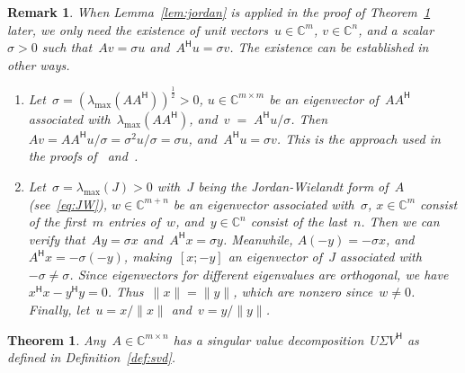 \documentclass[11pt,a4paper]{article}
\newtheorem{theorem}{Theorem}%
\newtheorem{remark}{Remark}%
\theoremstyle{definition}
\def\CC{\mathbb{C}}
\newcommand{\hmt}{{\scriptscriptstyle{{\mathsf{H}}}}}
\begin{document}
\begin{remark}
  When Lemma~\ref{lem:jordan} is applied in the proof of Theorem~\ref{th:svd} later, we only need
  the existence of unit vectors~$u\in\CC^{m}$, $v\in\CC^{n}$, and a scalar~$\sigma>0$
  such that~$Av = \sigma u$ and~$A^\hmt u = \sigma v$. The existence can be established in other
  ways. 
  \begin{enumerate}[leftmargin=1.5em]
    \item Let~$\sigma = (\lambda_{\max}(AA^\hmt))^{\frac{1}{2}}>0$, $u\in\CC^{m\times m}$ be an eigenvector
      of~$AA^\hmt$ associated with~$\lambda_{\max}(AA^\hmt)$, and~$v\;=\;A^\hmt u/\sigma$.
      Then~$Av = AA^\hmt u/\sigma = \sigma^2 u/\sigma=\sigma u$, and~$A^\hmt u = \sigma v$.   
      This is the approach used 
      in the proofs of~\cite[Theorem~4.1]{Trefethen_Bau_1997} and~\cite[Theorem~1]{Koranyi_2001}.
    \item Let~$\sigma = \lambda_{\max}(J) >0$ with~$J$ being the Jordan-Wielandt form of~$A$
      \textnormal{(}see~\eqref{eq:JW}\textnormal{)}, $w\in\CC^{m+n}$ be an eigenvector associated with~$\sigma$, 
      $x\in\CC^{m}$ consist of the first~$m$ entries of~$w$, and~$y\in\CC^{n}$ consist of the
      last~$n$. Then we can verify that~$Ay=\sigma x$ and~$A^\hmt x=\sigma y$.
      Meanwhile, $A(-y) = -\sigma x$, and~$A^\hmt x = -\sigma (-y)$, making~$[x; -y]$ 
      an eigenvector of~$J$ associated with~$-\sigma \neq \sigma$. Since eigenvectors for
    different eigenvalues are orthogonal, we have~$x^\hmt x - y^\hmt y= 0$. Thus~$\|x\|=\|y\|$,
    which are nonzero since~$w\neq 0$. Finally, let~$u = x/\|x\|$ and~$v = y/\|y\|$. 
  \end{enumerate}
\end{remark}

\begin{theorem}
  \label{th:svd}
  Any~$A\in\CC^{m\times n}$ has a singular value decomposition~$U\Sigma V^\hmt$
  as defined in Definition~\ref{def:svd}. 
\end{theorem}
\end{document}
